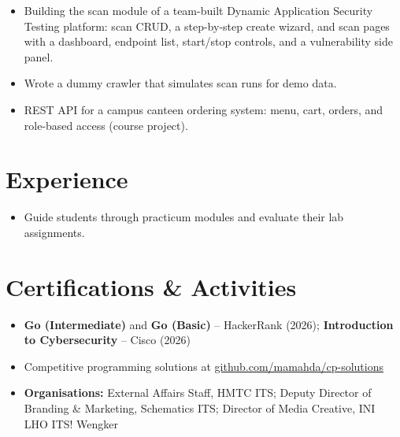 \vspace{2pt}

\begin{itemize}
    \item Building the scan module of a team-built Dynamic Application Security Testing platform: scan CRUD, a step-by-step create wizard, and scan pages with a dashboard, endpoint list, start/stop controls, and a vulnerability side panel.
    \item Wrote a dummy crawler that simulates scan runs for demo data.
\end{itemize}

\vspace{2pt}

\begin{itemize}
    \item REST API for a campus canteen ordering system: menu, cart, orders, and role-based access (course project).
\end{itemize}


\section{Experience}

\begin{itemize}
    \item Guide students through practicum modules and evaluate their lab assignments.
\end{itemize}

\vspace{2pt}



\section{Certifications \& Activities}

\begin{itemize}
    \item \textbf{Go (Intermediate)} and \textbf{Go (Basic)} -- HackerRank (2026); \textbf{Introduction to Cybersecurity} -- Cisco (2026)
    \item Competitive programming solutions at \href{https://github.com/mamahda/cp-solutions}{github.com/mamahda/cp-solutions}
    \item \textbf{Organisations:} External Affairs Staff, HMTC ITS; Deputy Director of Branding \& Marketing, Schematics ITS; Director of Media Creative, INI LHO ITS! Wengker
\end{itemize}


